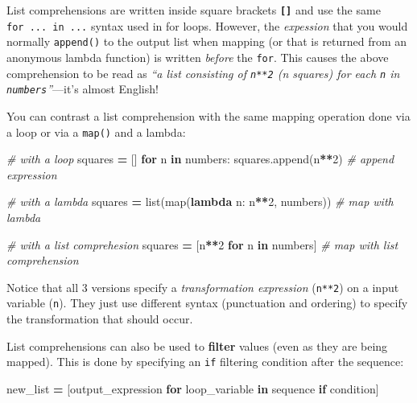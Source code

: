 \documentclass[]{book}
\newenvironment{Shaded}{\begin{snugshade}}{\end{snugshade}}
\newcommand{\KeywordTok}[1]{\textcolor[rgb]{0.13,0.29,0.53}{\textbf{#1}}}
\newcommand{\DecValTok}[1]{\textcolor[rgb]{0.00,0.00,0.81}{#1}}
\newcommand{\CommentTok}[1]{\textcolor[rgb]{0.56,0.35,0.01}{\textit{#1}}}
\newcommand{\ControlFlowTok}[1]{\textcolor[rgb]{0.13,0.29,0.53}{\textbf{#1}}}
\newcommand{\OperatorTok}[1]{\textcolor[rgb]{0.81,0.36,0.00}{\textbf{#1}}}
\newcommand{\BuiltInTok}[1]{#1}
\newcommand{\NormalTok}[1]{#1}
\begin{document}
List comprehensions are written inside square brackets
\textbf{\texttt{{[}{]}}} and use the same \texttt{for\ ...\ in\ ...}
syntax used in for loops. However, the \emph{expession} that you would
normally \texttt{append()} to the output list when mapping (or that is
returned from an anonymous lambda function) is written \emph{before} the
\texttt{for}. This causes the above comprehension to be read as
\emph{``a list consisting of \texttt{n**2} (n squares) for each
\texttt{n} in \texttt{numbers}''}---it's almost English!

You can contrast a list comprehension with the same mapping operation
done via a loop or via a \texttt{map()} and a lambda:

\begin{Shaded}
\begin{Highlighting}[]
\CommentTok{# with a loop}
\NormalTok{squares }\OperatorTok{=}\NormalTok{ []}
\ControlFlowTok{for}\NormalTok{ n }\KeywordTok{in}\NormalTok{ numbers:}
\NormalTok{    squares.append(n}\OperatorTok{**}\DecValTok{2}\NormalTok{)  }\CommentTok{# append expression}

\CommentTok{# with a lambda}
\NormalTok{squares }\OperatorTok{=} \BuiltInTok{list}\NormalTok{(}\BuiltInTok{map}\NormalTok{(}\KeywordTok{lambda}\NormalTok{ n: n}\OperatorTok{**}\DecValTok{2}\NormalTok{, numbers))  }\CommentTok{# map with lambda}

\CommentTok{# with a list comprehesion}
\NormalTok{squares }\OperatorTok{=}\NormalTok{ [n}\OperatorTok{**}\DecValTok{2} \ControlFlowTok{for}\NormalTok{ n }\KeywordTok{in}\NormalTok{ numbers]  }\CommentTok{# map with list comprehension}
\end{Highlighting}
\end{Shaded}

Notice that all 3 versions specify a \emph{transformation expression}
(\texttt{n**2}) on a input variable (\texttt{n}). They just use
different syntax (punctuation and ordering) to specify the
transformation that should occur.

List comprehensions can also be used to \textbf{filter} values (even as
they are being mapped). This is done by specifying an \texttt{if}
filtering condition after the sequence:

\begin{Shaded}
\begin{Highlighting}[]
\NormalTok{new_list }\OperatorTok{=}\NormalTok{ [output_expression }\ControlFlowTok{for}\NormalTok{ loop_variable }\KeywordTok{in}\NormalTok{ sequence }\ControlFlowTok{if}\NormalTok{ condition]}
\end{Highlighting}
\end{Shaded}
\end{document}
